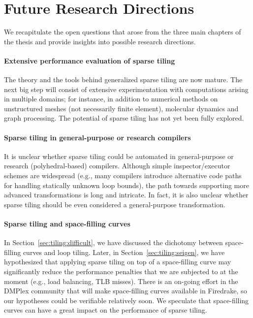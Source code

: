 \section{Future Research Directions}
We recapitulate the open questions that arose from the three main chapters of the thesis and provide insights into possible research directions.

\paragraph{Extensive performance evaluation of sparse tiling}
The theory and the tools behind generalized sparse tiling are now mature. The next big step will consist of extensive experimentation with computations arising in multiple domains; for instance, in addition to numerical methods on unstructured meshes (not necessarily finite element), molecular dynamics and graph processing. The potential of sparse tiling has not yet been fully explored.

\paragraph{Sparse tiling in general-purpose or research compilers}
It is unclear whether sparse tiling could be automated in general-purpose or research (polyhedral-based) compilers. Although simple inspector/executor schemes are widespread (e.g., many compilers introduce alternative code paths for handling statically unknown loop bounds), the path towards supporting more advanced transformations is long and intricate. In fact, it is also unclear whether sparse tiling should be even considered a general-purpose transformation.

\paragraph{Sparse tiling and space-filling curves}
In Section~\ref{sec:tiling:difficult}, we have discussed the dichotomy between space-filling curves and loop tiling. Later, in Section~\ref{sec:tiling:seigen}, we have hypothesized that applying sparse tiling on top of a space-filling curve may significantly reduce the performance penalties that we are subjected to at the moment (e.g., load balancing, TLB misses). There is an on-going effort in the DMPlex community that will make space-filling curves available in Firedrake, so our hypotheses could be verifiable relatively soon. We speculate that space-filling curves can have a great impact on the performance of sparse tiling.

